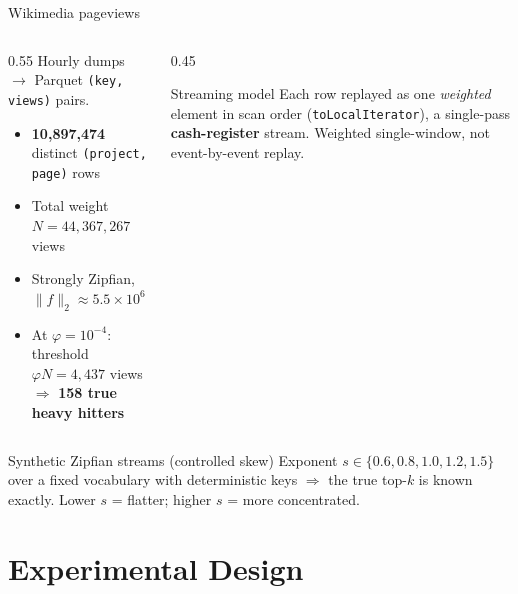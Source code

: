 \documentclass[11pt,aspectratio=169]{beamer}
\newcommand{\hh}{heavy hitter}
\begin{document}
\begin{frame}{Wikimedia pageviews \cite{wikimediaPageviews}}
  \begin{columns}[T]
    \begin{column}{0.55\textwidth}
      Hourly dumps $\to$ Parquet \texttt{(key, views)} pairs.
      \begin{itemize}
        \item \textbf{10{,}897{,}474} distinct \texttt{(project, page)} rows
        \item Total weight $N = 44{,}367{,}267$ views
        \item Strongly Zipfian, $\lVert f\rVert_2 \approx 5.5\times10^6$
        \item At $\varphi=10^{-4}$: threshold $\varphi N = 4{,}437$ views
              $\Rightarrow$ \textbf{158 true \hh{}s}
      \end{itemize}
    \end{column}
    \begin{column}{0.45\textwidth}
      \begin{block}{Streaming model}
        Each row replayed as one \emph{weighted} element in scan order
        (\texttt{toLocalIterator}), a single-pass \textbf{cash-register}
        stream. Weighted single-window, not event-by-event replay.
      \end{block}
    \end{column}
  \end{columns}
  \vspace{0.5em}
  \begin{exampleblock}{Synthetic Zipfian streams (controlled skew)}
    Exponent $s\in\{0.6,0.8,1.0,1.2,1.5\}$ over a fixed vocabulary with
    deterministic keys $\Rightarrow$ the true top-$k$ is known exactly.
    Lower $s$ = flatter; higher $s$ = more concentrated.
  \end{exampleblock}
\end{frame}

\section{Experimental Design}
\end{document}

